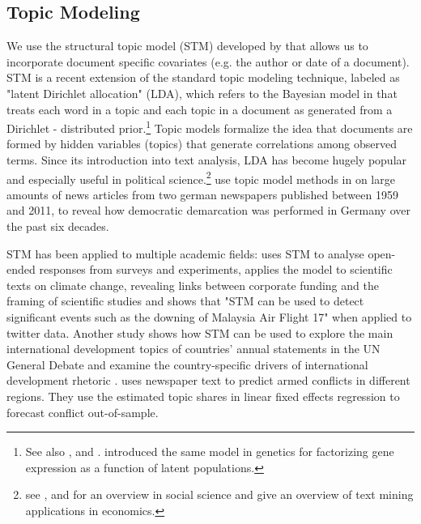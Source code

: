 \documentclass[12pt,a4paper,notitlepage]{article}
\begin{document}
\subsection{Topic Modeling}

We use the structural topic model (STM) developed by \citet{roberts_model_2016} that allows us to incorporate document specific covariates (e.g. the author or date of a document). STM is a recent extension of the standard topic modeling technique, labeled as "latent Dirichlet allocation" (LDA), which refers to the Bayesian model in \citet{blei_latent_2003} that treats each word in a topic and each topic in a document as generated from a Dirichlet - distributed prior.\footnote{See also \citet{griffiths_probabilistic_2002}, \citet{griffiths_finding_2004} and \citet{hofmann_probabilistic_1999}. \citet{pritchard_inference_2000} introduced the same model in genetics for factorizing gene expression as a function of latent populations.} Topic models formalize the idea that documents are formed by hidden variables (topics) that generate correlations among observed terms. Since its introduction into text analysis, LDA has become hugely popular and especially useful in political science.\footnote{see \citet{blei_probabilistic_2012}, \citet{grimmer_text_2013} and \citet{wiedmann_text_2016} for an overview in social science and \citet{gentzkow_text_2017} give an overview of text mining applications in economics.} \citet{wiedmann_text_2016} use topic model methods in on large amounts of news articles from two german newspapers published between 1959 and 2011, to reveal how democratic demarcation was performed in Germany over the past six decades. 

STM has been applied to multiple academic fields: \citet{roberts_structural_2014} uses STM to analyse open-ended responses from surveys and experiments, \citet{farrell_corporate_2016} applies the model to scientific texts on climate change, revealing links between corporate funding and the framing of scientific studies and \citet{mishler_using_2015} shows that "STM can be used to detect significant events such as the downing of Malaysia Air Flight 17" when applied to twitter data. Another study shows how STM can be used to explore the main international development topics of countries’ annual statements in the UN General Debate and examine the country-specific drivers of international development rhetoric \citep{baturo_what_2017}. \citet{mueller_reading_2016} uses newspaper text to predict armed conflicts in different regions. They use the estimated topic shares in linear fixed effects regression to forecast conflict out-of-sample.
\end{document}
